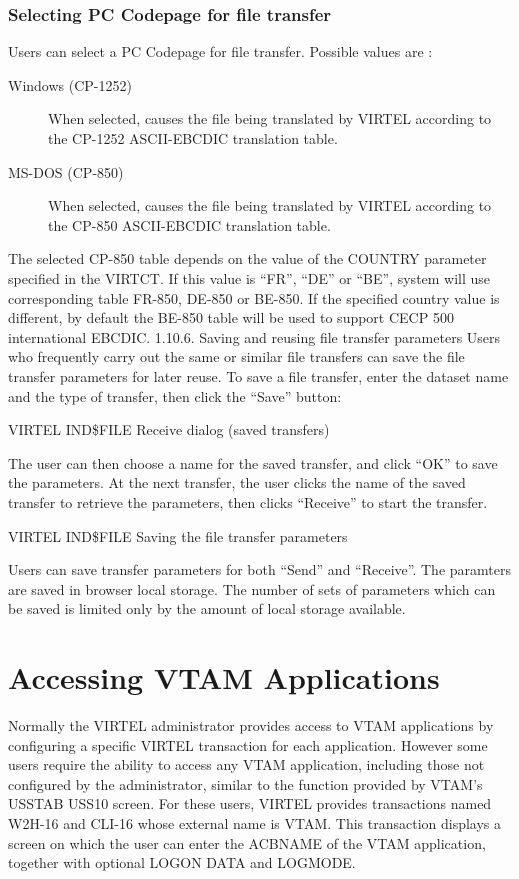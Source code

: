 \documentclass[letterpaper,10pt,english]{sphinxmanual}
\begin{document}
\subsubsection{Selecting PC Codepage for file transfer}
\label{\detokenize{User_Guide:selecting-pc-codepage-for-file-transfer}}
Users can select a PC Codepage for file transfer. Possible values are :
\begin{description}
\item[{Windows (CP-1252)}] \leavevmode
When selected, causes the file being translated by VIRTEL according to the CP-1252 ASCII-EBCDIC translation table.

\item[{MS-DOS (CP-850)}] \leavevmode
When selected, causes the file being translated by VIRTEL according to the CP-850 ASCII-EBCDIC translation table.

\end{description}

The selected CP-850 table depends on the value of the COUNTRY parameter specified in the VIRTCT. If this value is
“FR”, “DE” or “BE”, system will use corresponding table FR-850, DE-850 or BE-850. If the specified country value is
different, by default the BE-850 table will be used to support CECP 500 international EBCDIC.
1.10.6. Saving and reusing file transfer parameters
Users who frequently carry out the same or similar file transfers can save the file transfer parameters for later reuse.
To save a file transfer, enter the dataset name and the type of transfer, then click the “Save” button:

VIRTEL IND\$FILE Receive dialog (saved transfers)

The user can then choose a name for the saved transfer, and click “OK” to save the parameters. At the next transfer,
the user clicks the name of the saved transfer to retrieve the parameters, then clicks “Receive” to start the transfer.

VIRTEL IND\$FILE Saving the file transfer parameters

Users can save transfer parameters for both “Send” and “Receive”. The paramters are saved in browser local storage.
The number of sets of parameters which can be saved is limited only by the amount of local storage available.


\section{Accessing VTAM Applications}
\label{\detokenize{User_Guide:accessing-vtam-applications}}
Normally the VIRTEL administrator provides access to VTAM applications by configuring a specific VIRTEL transaction
for each application. However some users require the ability to access any VTAM application, including those not
configured by the administrator, similar to the function provided by VTAM’s USSTAB USS10 screen. For these users,
VIRTEL provides transactions named W2H-16 and CLI-16 whose external name is VTAM.
This transaction displays a screen on which the user can enter the ACBNAME of the VTAM application, together with
optional LOGON DATA and LOGMODE.
\end{document}
